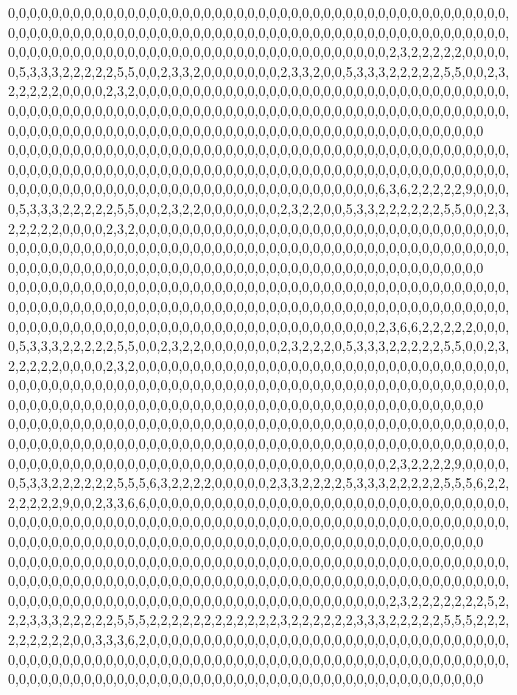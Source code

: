 0,0,0,0,0,0,0,0,0,0,0,0,0,0,0,0,0,0,0,0,0,0,0,0,0,0,0,0,0,0,0,0,0,0,0,0,0,0,0,0,0,0,0,0,0,0,0,0,0,0,0,0,0,0,0,0,0,0,0,0,0,0,0,0,0,0,0,0,0,0,0,0,0,0,0,0,0,0,0,0,0,0,0,0,0,0,0,0,0,0,0,0,0,0,0,0,0,0,0,0,0,0,0,0,0,0,0,0,0,0,0,0,0,0,0,0,0,0,0,0,0,0,0,0,0,0,0,2,3,2,2,2,2,2,0,0,0,0,0,5,3,3,3,2,2,2,2,2,5,5,0,0,2,3,3,2,0,0,0,0,0,0,0,2,3,3,2,0,0,5,3,3,3,2,2,2,2,2,5,5,0,0,2,3,2,2,2,2,2,0,0,0,0,2,3,2,0,0,0,0,0,0,0,0,0,0,0,0,0,0,0,0,0,0,0,0,0,0,0,0,0,0,0,0,0,0,0,0,0,0,0,0,0,0,0,0,0,0,0,0,0,0,0,0,0,0,0,0,0,0,0,0,0,0,0,0,0,0,0,0,0,0,0,0,0,0,0,0,0,0,0,0,0,0,0,0,0,0,0,0,0,0,0,0,0,0,0,0,0,0,0,0,0,0,0,0,0,0,0,0,0,0,0,0,0,0,0,0,0,0,0,0,0,0,0,0,0,0,0,0
0,0,0,0,0,0,0,0,0,0,0,0,0,0,0,0,0,0,0,0,0,0,0,0,0,0,0,0,0,0,0,0,0,0,0,0,0,0,0,0,0,0,0,0,0,0,0,0,0,0,0,0,0,0,0,0,0,0,0,0,0,0,0,0,0,0,0,0,0,0,0,0,0,0,0,0,0,0,0,0,0,0,0,0,0,0,0,0,0,0,0,0,0,0,0,0,0,0,0,0,0,0,0,0,0,0,0,0,0,0,0,0,0,0,0,0,0,0,0,0,0,0,0,0,0,0,6,3,6,2,2,2,2,2,9,0,0,0,0,5,3,3,3,2,2,2,2,2,5,5,0,0,2,3,2,2,0,0,0,0,0,0,0,2,3,2,2,0,0,5,3,3,2,2,2,2,2,2,5,5,0,0,2,3,2,2,2,2,2,0,0,0,0,2,3,2,0,0,0,0,0,0,0,0,0,0,0,0,0,0,0,0,0,0,0,0,0,0,0,0,0,0,0,0,0,0,0,0,0,0,0,0,0,0,0,0,0,0,0,0,0,0,0,0,0,0,0,0,0,0,0,0,0,0,0,0,0,0,0,0,0,0,0,0,0,0,0,0,0,0,0,0,0,0,0,0,0,0,0,0,0,0,0,0,0,0,0,0,0,0,0,0,0,0,0,0,0,0,0,0,0,0,0,0,0,0,0,0,0,0,0,0,0,0,0,0,0,0,0,0
0,0,0,0,0,0,0,0,0,0,0,0,0,0,0,0,0,0,0,0,0,0,0,0,0,0,0,0,0,0,0,0,0,0,0,0,0,0,0,0,0,0,0,0,0,0,0,0,0,0,0,0,0,0,0,0,0,0,0,0,0,0,0,0,0,0,0,0,0,0,0,0,0,0,0,0,0,0,0,0,0,0,0,0,0,0,0,0,0,0,0,0,0,0,0,0,0,0,0,0,0,0,0,0,0,0,0,0,0,0,0,0,0,0,0,0,0,0,0,0,0,0,0,0,0,0,2,3,6,6,2,2,2,2,2,0,0,0,0,5,3,3,3,2,2,2,2,2,5,5,0,0,2,3,2,2,0,0,0,0,0,0,0,2,3,2,2,2,0,5,3,3,3,2,2,2,2,2,5,5,0,0,2,3,2,2,2,2,2,0,0,0,0,2,3,2,0,0,0,0,0,0,0,0,0,0,0,0,0,0,0,0,0,0,0,0,0,0,0,0,0,0,0,0,0,0,0,0,0,0,0,0,0,0,0,0,0,0,0,0,0,0,0,0,0,0,0,0,0,0,0,0,0,0,0,0,0,0,0,0,0,0,0,0,0,0,0,0,0,0,0,0,0,0,0,0,0,0,0,0,0,0,0,0,0,0,0,0,0,0,0,0,0,0,0,0,0,0,0,0,0,0,0,0,0,0,0,0,0,0,0,0,0,0,0,0,0,0,0,0
0,0,0,0,0,0,0,0,0,0,0,0,0,0,0,0,0,0,0,0,0,0,0,0,0,0,0,0,0,0,0,0,0,0,0,0,0,0,0,0,0,0,0,0,0,0,0,0,0,0,0,0,0,0,0,0,0,0,0,0,0,0,0,0,0,0,0,0,0,0,0,0,0,0,0,0,0,0,0,0,0,0,0,0,0,0,0,0,0,0,0,0,0,0,0,0,0,0,0,0,0,0,0,0,0,0,0,0,0,0,0,0,0,0,0,0,0,0,0,0,0,0,0,0,0,0,0,2,3,2,2,2,2,9,0,0,0,0,0,5,3,3,2,2,2,2,2,2,5,5,5,6,3,2,2,2,2,0,0,0,0,0,2,3,3,2,2,2,2,5,3,3,3,2,2,2,2,2,5,5,5,6,2,2,2,2,2,2,2,9,0,0,2,3,3,6,6,0,0,0,0,0,0,0,0,0,0,0,0,0,0,0,0,0,0,0,0,0,0,0,0,0,0,0,0,0,0,0,0,0,0,0,0,0,0,0,0,0,0,0,0,0,0,0,0,0,0,0,0,0,0,0,0,0,0,0,0,0,0,0,0,0,0,0,0,0,0,0,0,0,0,0,0,0,0,0,0,0,0,0,0,0,0,0,0,0,0,0,0,0,0,0,0,0,0,0,0,0,0,0,0,0,0,0,0,0,0,0,0,0,0,0,0,0,0,0,0,0,0,0
0,0,0,0,0,0,0,0,0,0,0,0,0,0,0,0,0,0,0,0,0,0,0,0,0,0,0,0,0,0,0,0,0,0,0,0,0,0,0,0,0,0,0,0,0,0,0,0,0,0,0,0,0,0,0,0,0,0,0,0,0,0,0,0,0,0,0,0,0,0,0,0,0,0,0,0,0,0,0,0,0,0,0,0,0,0,0,0,0,0,0,0,0,0,0,0,0,0,0,0,0,0,0,0,0,0,0,0,0,0,0,0,0,0,0,0,0,0,0,0,0,0,0,0,0,0,0,2,3,2,2,2,2,2,2,2,5,2,2,2,3,3,3,2,2,2,2,2,5,5,5,2,2,2,2,2,2,2,2,2,2,2,2,3,2,2,2,2,2,2,3,3,3,2,2,2,2,2,5,5,5,2,2,2,2,2,2,2,2,2,0,0,3,3,3,6,2,0,0,0,0,0,0,0,0,0,0,0,0,0,0,0,0,0,0,0,0,0,0,0,0,0,0,0,0,0,0,0,0,0,0,0,0,0,0,0,0,0,0,0,0,0,0,0,0,0,0,0,0,0,0,0,0,0,0,0,0,0,0,0,0,0,0,0,0,0,0,0,0,0,0,0,0,0,0,0,0,0,0,0,0,0,0,0,0,0,0,0,0,0,0,0,0,0,0,0,0,0,0,0,0,0,0,0,0,0,0,0,0,0,0,0,0,0,0,0,0,0,0,0

